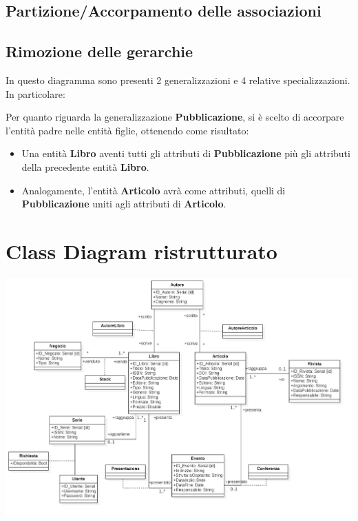         \subsection{Partizione/Accorpamento delle associazioni}
            
        \subsection{Rimozione delle gerarchie}
            In questo diagramma sono presenti 2 generalizzazioni e 4 relative specializzazioni.
            In particolare:

            Per quanto riguarda la generalizzazione \textbf{Pubblicazione}, si è scelto di accorpare l'entità padre
            nelle entità figlie, ottenendo come risultato:
            \begin{itemize}
                  \item Una entità \textbf{Libro} aventi tutti gli attributi di \textbf{Pubblicazione} più
                        gli attributi della precedente entità \textbf{Libro}.
                  \item Analogamente, l'entità \textbf{Articolo} avrà come attributi, quelli di \textbf{Pubblicazione}
                        uniti agli attributi di \textbf{Articolo}.
            \end{itemize}
    
    \section{Class Diagram ristrutturato}
    \includegraphics[scale=0.25]{Immagini/SchemaRistrutturato.png}
        \pagebreak
